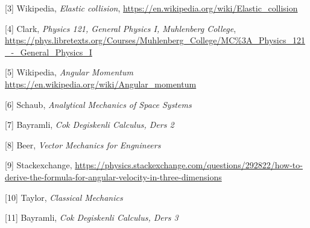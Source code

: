 \documentclass[12pt,fleqn]{article}\usepackage{../../common}
\begin{document}
[3] Wikipedia, {\em Elastic collision}, \url{https://en.wikipedia.org/wiki/Elastic_collision}

[4] Clark, {\em Physics 121, General Physics I, Muhlenberg College},
    \url{https://phys.libretexts.org/Courses/Muhlenberg_College/MC%3A_Physics_121_-_General_Physics_I}

[5] Wikipedia, {\em Angular Momentum}
    \url{https://en.wikipedia.org/wiki/Angular_momentum}

[6] Schaub, {\em Analytical Mechanics of Space Systems}

[7] Bayramli, {\em Cok Degiskenli Calculus, Ders 2}

[8] Beer, {\em Vector Mechanics for Engnineers}

[9] Stackexchange, \url{https://physics.stackexchange.com/questions/292822/how-to-derive-the-formula-for-angular-velocity-in-three-dimensions}

[10] Taylor, {\em Classical Mechanics}

[11] Bayramli, {\em Cok Degiskenli Calculus, Ders 3}
\end{document}
